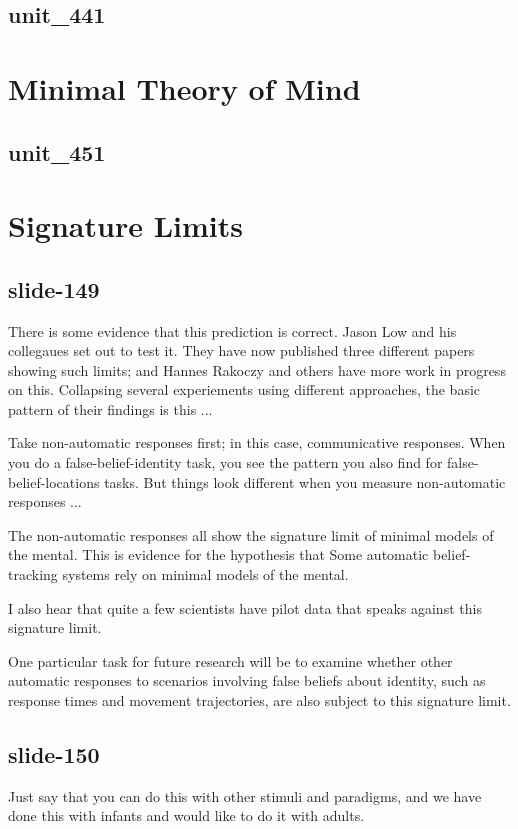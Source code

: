\documentclass[12pt,\papersize]{extarticle}
\begin{document}
\subsection{unit\_441}


\section{Minimal Theory of Mind}

\subsection{unit\_451}


\section{Signature Limits}

\subsection{slide-149}
There is  some evidence that this prediction is correct.
Jason Low and his collegaues set out to test it.
They have now published three
different papers showing such limits; and Hannes Rakoczy and others
have more work in progress on this.
Collapsing several experiements using different approaches,
the basic pattern of their findings is this ...

Take non-automatic responses first; in this case, communicative responses.
When you do a false-belief-identity task, you see the pattern you also
find for false-belief-locations tasks.
But things look different when you measure non-automatic responses ...

The non-automatic responses all show the signature limit of minimal
models of the mental.
This is evidence for the hypothesis that
Some automatic belief-tracking systems rely on minimal models of the mental.

I also hear that quite a few scientists have pilot data that speaks
against this signature limit.

One particular task for future research will be to examine whether other
automatic responses to scenarios involving false beliefs about identity,
such as response times and movement trajectories, are also subject
to this signature limit.

\subsection{slide-150}
Just say that you can do this with other stimuli and paradigms, and we
have done this with infants and would like to do it with adults.
\end{document}
